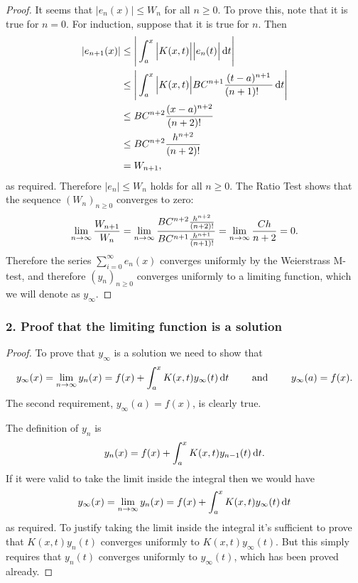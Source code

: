 \documentclass[12pt]{article}
\begin{document}
\begin{proof}
It seems that $|e_n(x)| \leq W_n$ for all $n \geq 0$. To prove this, note that
it is true for $n=0$. For induction, suppose that it is true for $n$. Then
\begin{align*}
  |e_{n+1}(x)|& \leq \Bigg|\int_a^x \Big|K(x, t)\Big| \Big|e_{n}(t)\Big|\dt\Bigg|\\
             & \leq \Bigg|\int_a^x \Big|K(x, t)\Big| BC^{n+1}\frac{(t - a)^{n+1}}{(n+1)!^{~~~~}}\dt\Bigg|\\
             & \leq BC^{n+2}\frac{(x - a)^{n+2}}{(n+2)!^{~~~}}\\
             & \leq BC^{n+2}\frac{h^{n+2}}{(n+2)!}\\
             &= W_{n+1},
\end{align*}
as required. Therefore $|e_n| \leq W_n$ holds for all $n \geq 0$. The Ratio
Test shows that the sequence $(W_n)_{n\geq 0}$ converges to zero:
\begin{align*}
  \lim\limits_{n \to \infty} \frac{W_{n+1}}{W_n}
  = \lim\limits_{n \to \infty} \frac{BC^{n+2}\frac{h^{n+2}}{(n+2)!}}
                {BC^{n+1}\frac{h^{n+1}}{(n+1)!}}
  = \lim\limits_{n \to \infty} \frac{Ch}{n+2}
  = 0.
\end{align*}
Therefore the series $\sum_{i=0}^\infty e_n(x)$ converges uniformly by the
Weierstrass M-test, and therefore $(y_n)_{n\geq 0}$ converges uniformly to a
limiting function, which we will denote as $y_\infty$.
\end{proof}

\subsubsection*{2. Proof that the limiting function is a solution}

\begin{proof}
To prove that $y_\infty$ is a solution we need to show that
\begin{align*}
  y_\infty(x) = \limn y_n(x) = f(x) + \int_a^x K(x, t) y_\infty(t) \dt
  ~~~~~~~\text{and}~~~~~~~
  y_\infty(a) = f(x).
\end{align*}
The second requirement, $y_\infty(a) = f(x)$, is clearly true.

The definition of $y_n$ is
\begin{align*}
  y_n(x) = f(x) + \int_a^x K(x, t) y_{n-1}(t) \dt.
\end{align*}
If it were valid to take the limit inside the integral then we would have
\begin{align*}
  y_\infty(x) = \limn y_n(x) = f(x) + \int_a^x K(x, t) y_\infty(t) \dt
\end{align*}
as required. To justify taking the limit inside the integral it's sufficient to
prove that $K(x, t) y_{n}(t)$ converges uniformly to $K(x, t) y_\infty(t)$. But
this simply requires that $y_{n}(t)$ converges uniformly to $y_\infty(t)$,
which has been proved already.
\end{proof}
\end{document}
